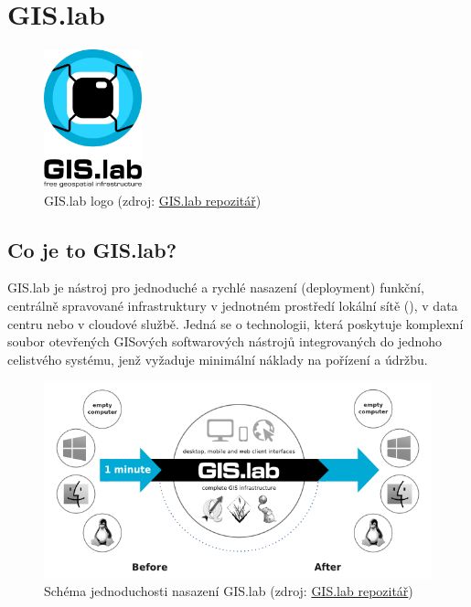 \chapter{GIS.lab}
\label{2-teorie}

\begin{figure}[H] \centering
    \includegraphics[width=80pt]{./pictures/gislab-logo.png}
    \caption[GIS.lab logo]{GIS.lab logo (zdroj:
	\href{https://github.com/gislab-npo/gislab-doc/blob/master/img/logo.svg}{GIS.lab repozitář})}
	\label{fig:gislab-logo}
\end{figure}

\section{Co je to GIS.lab?}

GIS.lab je nástroj pro jednoduché a rychlé nasazení (deployment)
funkční, centrálně spravované  infrastruktury v jednotném
prostředí lokální sítě (), v data centru nebo v cloudové
službě. Jedná se o technologii, která poskytuje komplexní soubor
otevřených GISových softwarových nástrojů integrovaných do jednoho
celistvého systému, jenž vyžaduje minimální náklady na
pořízení a údržbu. 

\begin{figure}[H] \centering
    \includegraphics[width=400pt]{./pictures/gislab-schema.png}
    \caption[Schéma jednoduchosti nasazení GIS.lab]{Schéma jednoduchosti nasazení GIS.lab (zdroj:
	\href{https://github.com/gislab-npo/gislab-doc/blob/master/img/general/gislab-schema.png}{GIS.lab repozitář})}
	\label{fig:gislab-schema}
\end{figure}

